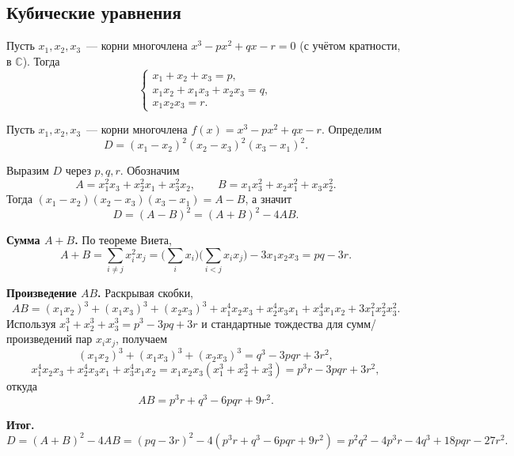 \documentclass[12pt]{article}
\begin{document}
    \subsection{Кубические уравнения}
    
    \begin{statement}
    	Пусть $x_1, x_2, x_3$~--- корни многочлена $x^3 - px^2 + qx - r = 0$ (с учётом кратности, в $\mathbb{C}$). Тогда
    	\[
    		\begin{cases}
    			x_1 + x_2 + x_3 = p, \\
    			x_1 x_2 + x_1 x_3 + x_2 x_3 = q, \\
    			x_1 x_2 x_3 = r.
    		\end{cases}
    	\]
    \end{statement}
    
    \begin{definition}
    	Пусть $x_1, x_2, x_3$~--- корни многочлена $f(x) = x^3 - px^2 + qx - r$. Определим
    	\[
    		D = (x_1 - x_2)^2 (x_2 - x_3)^2 (x_3 - x_1)^2.
    	\]
    	
    	Выразим $D$ через $p, q, r$. Обозначим
    	\[
    		A = x_1^2x_3 + x_2^2x_1 + x_3^2x_2, \qquad B = x_1x_3^2 + x_2x_1^2 + x_3x_2^2.
    	\]
    	Тогда $(x_1-x_2)(x_2-x_3)(x_3-x_1) = A - B$, а значит
    	\[
    		D = (A - B)^2 = (A+B)^2 - 4AB.
    	\]
    	
    	\textbf{Сумма $A+B$.} По теореме Виета,
    	\[
    		A + B = \sum_{i \ne j} x_i^2 x_j = \Big( \sum_i x_i \Big) \Big( \sum_{i<j} x_i x_j \Big) - 3x_1x_2x_3 = pq - 3r.
    	\]
    	
    	\textbf{Произведение $AB$.} Раскрывая скобки,
    	\[
    		AB = (x_1x_2)^3 + (x_1x_3)^3 + (x_2x_3)^3 + x_1^4x_2x_3 + x_2^4x_3x_1 + x_3^4x_1x_2 + 3x_1^2x_2^2x_3^2.
    	\]
    	Используя $x_1^3+x_2^3+x_3^3 = p^3 - 3pq + 3r$ и стандартные тождества для сумм/произведений пар $x_ix_j$, получаем
    	\[
    		(x_1x_2)^3 + (x_1x_3)^3 + (x_2x_3)^3 = q^3 - 3pqr + 3r^2,
    	\]
    	\[
    		x_1^4x_2x_3 + x_2^4x_3x_1 + x_3^4x_1x_2 = x_1x_2x_3(x_1^3+x_2^3+x_3^3) = p^3r - 3pqr + 3r^2,
    	\]
    	откуда
    	\[
    		AB = p^3r + q^3 - 6pqr + 9r^2.
    	\]
    	
    	\textbf{Итог.}
    	\[
    		D = (A+B)^2 - 4AB = (pq - 3r)^2 - 4(p^3r + q^3 - 6pqr + 9r^2) = p^2q^2 - 4p^3r - 4q^3 + 18pqr - 27r^2.
    	\]
    \end{definition}
    
\end{document}
